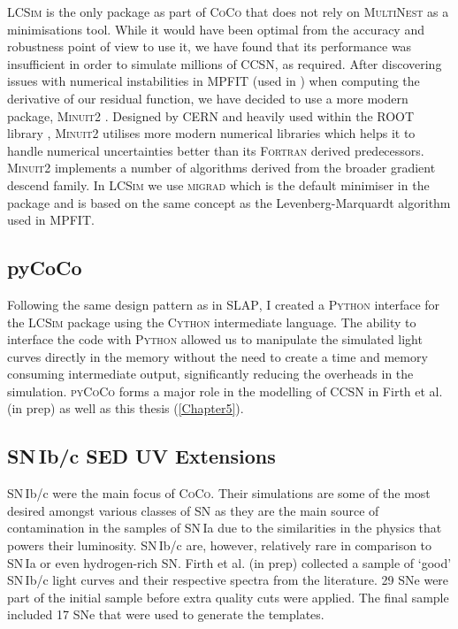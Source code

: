 \textsc{LCSim} is the only package as part of \textsc{CoCo} that does not rely on \textsc{MultiNest} as a minimisations tool. While it would have been optimal from the accuracy and robustness point of view to use it, we have found that its performance was insufficient in order to simulate millions of CCSN, as required. After discovering issues with numerical instabilities in \textsc{MPFIT} (used in ) when computing the derivative of our residual function, we have decided to use a more modern package, \textsc{Minuit2} \citep{James1975}. Designed by CERN and heavily used within the ROOT library \citep{Brun1997}, \textsc{Minuit2} utilises more modern numerical libraries which helps it to handle numerical uncertainties better than its \textsc{Fortran} derived predecessors. \textsc{Minuit2} implements a number of algorithms derived from the broader gradient descend family. In \textsc{LCSim} we use \textsc{migrad} which is the default minimiser in the package and is based on the same concept as the Levenberg-Marquardt algorithm used in \textsc{MPFIT}.

\subsection{pyCoCo}
Following the same design pattern as in \textsc{SLAP}, I created a \textsc{Python} interface for the \textsc{LCSim} package using the \textsc{Cython} intermediate language. The ability to interface the code with \textsc{Python} allowed us to manipulate the simulated light curves directly in the memory without the need to create a time and memory consuming intermediate output, significantly reducing the overheads in the simulation. \textsc{pyCoCo} forms a major role in the modelling of CCSN in Firth et al. (in prep) as well as this thesis (\cref{Chapter5}).

\subsection{SN\,Ib/c SED UV Extensions}
SN\,Ib/c were the main focus of \textsc{CoCo}. Their simulations are some of the most desired amongst various classes of SN as they are the main source of contamination in the samples of SN\,Ia due to the similarities in the physics that powers their luminosity. SN\,Ib/c are, however, relatively rare in comparison to SN\,Ia or even hydrogen-rich SN.   Firth et al. (in prep) collected a sample of `good' SN\,Ib/c light curves and their respective spectra from the literature. 29 SNe were part of the initial sample before extra quality cuts were applied. The final sample included 17 SNe that were used to generate the templates.

